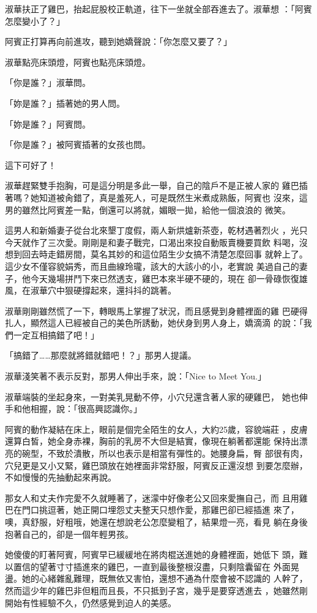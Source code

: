 淑華扶正了雞巴，抬起屁股校正軌道，往下一坐就全部吞進去了。淑華想
：「阿賓怎麼變小了？」

阿賓正打算再向前進攻，聽到她嬌聲說：「你怎麼又要了？」

淑華點亮床頭燈，阿賓也點亮床頭燈。

「你是誰？」淑華問。

「妳是誰？」插著她的男人問。

「妳是誰？」阿賓問。

「你是誰？」被阿賓插著的女孩也問。

這下可好了！

淑華趕緊雙手抱胸，可是這分明是多此一舉，自己的陰戶不是正被人家的
雞巴插著嗎？她知道被肏錯了，真是羞死人，可是既然生米煮成熟飯，阿賓也
沒來，這男的雖然比阿賓差一點，倒還可以將就，媚眼一拋，給他一個浪浪的
微笑。

這男人和新婚妻子從台北來墾丁度假，兩人新烘爐新茶壺，乾材遇著烈火
，光只今天就作了三次愛。剛剛是和妻子戰完，口渴出來投自動販賣機要買飲
料喝，沒想到回去時走錯房間，莫名其妙的和這位陌生少女搞不清楚怎麼回事
就幹上了。這少女不僅容貌娟秀，而且曲線玲瓏，該大的大該小的小，老實說
美過自己的妻子，他今天幾場拼鬥下來已然透支，雞巴本來半硬不硬的，現在
卻一骨碌恢復雄風，在淑華穴中狠硬撐起來，還抖抖的跳著。

淑華剛剛雖然慌了一下，轉眼馬上掌握了狀況，而且感覺到身體裡面的雞
巴硬得扎人，顯然這人已經被自己的美色所誘動，她伏身到男人身上，嬌滴滴
的說：「我們一定互相搞錯了吧！」

「搞錯了……那麼就將錯就錯吧！？」那男人提議。

淑華淺笑著不表示反對，那男人伸出手來，說：「Nice to Meet You.」

淑華端裝的坐起身來，一對美乳晃動不停，小穴兒還含著人家的硬雞巴，
她也伸手和他相握，說：「很高興認識你。」

阿賓的動作凝結在床上，眼前是個完全陌生的女人，大約25歲，容貌端莊
，皮膚還算白皙，她全身赤裸，胸前的乳房不大但是結實，像現在躺著都還能
保持出漂亮的碗型，不致於潰散，所以也表示是相當有彈性的。她腰身扁，臀
部很有肉，穴兒更是又小又緊，雞巴頭放在她裡面非常舒服，阿賓反正還沒想
到要怎麼辦，不如慢慢的先抽動起來再說。

那女人和丈夫作完愛不久就睡著了，迷濛中好像老公又回來愛撫自己，而
且用雞巴在門口挑逗著，她正開口埋怨丈夫整天只想作愛，那雞巴卻已經插進
來了，噢，真舒服，好粗哦，她還在想說老公怎麼變粗了，結果燈一亮，看見
躺在身後抱著自己的，卻是一個年輕男孩。

她傻傻的盯著阿賓，阿賓早已緩緩地在將肉棍送進她的身體裡面，她低下
頭，難以置信的望著寸寸插進來的雞巴，一直到最後整根沒盡，只剩陰囊留在
外面晃盪。她的心緒雜亂難理，既無依又害怕，還想不通為什麼會被不認識的
人幹了，然而這少年的雞巴非但粗而且長，不只抵到子宮，幾乎是要穿透進去
，她雖然剛開始有性經驗不久，仍然感覺到迫人的美感。

